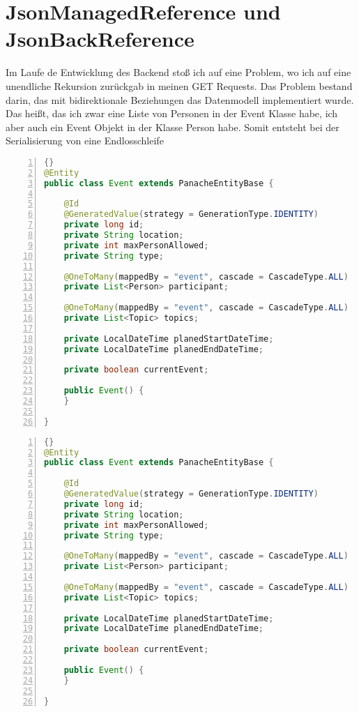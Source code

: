 \section{JsonManagedReference und JsonBackReference}

Im Laufe de Entwicklung des Backend stoß ich auf eine Problem, wo ich auf eine unendliche Rekursion zurückgab in meinen GET Requests. Das Problem bestand darin, das mit bidirektionale Beziehungen das Datenmodell implementiert wurde. Das heißt, das ich zwar eine Liste von Personen in der Event Klasse habe, ich aber auch ein Event Objekt in der Klasse Person habe. Somit entsteht bei der Serialisierung von eine Endlosschleife


\begin{lstlisting}[numbers=left,language=java,caption=Event Klasse,label={lst:event_class}]{}
@Entity
public class Event extends PanacheEntityBase {

    @Id
    @GeneratedValue(strategy = GenerationType.IDENTITY)
    private long id;
    private String location;
    private int maxPersonAllowed;
    private String type;

    @OneToMany(mappedBy = "event", cascade = CascadeType.ALL)
    private List<Person> participant;

    @OneToMany(mappedBy = "event", cascade = CascadeType.ALL)
    private List<Topic> topics;

    private LocalDateTime planedStartDateTime;
    private LocalDateTime planedEndDateTime;

    private boolean currentEvent;

    public Event() {
    }

}
\end{lstlisting}

\newpage 

\begin{lstlisting}[numbers=left,language=java,caption=Person Klasse,label={lst:Person_Klasse}]{}
@Entity
public class Event extends PanacheEntityBase {

    @Id
    @GeneratedValue(strategy = GenerationType.IDENTITY)
    private long id;
    private String location;
    private int maxPersonAllowed;
    private String type;

    @OneToMany(mappedBy = "event", cascade = CascadeType.ALL)
    private List<Person> participant;

    @OneToMany(mappedBy = "event", cascade = CascadeType.ALL)
    private List<Topic> topics;

    private LocalDateTime planedStartDateTime;
    private LocalDateTime planedEndDateTime;

    private boolean currentEvent;

    public Event() {
    }

}
\end{lstlisting}


